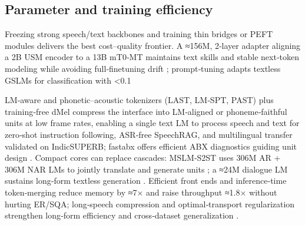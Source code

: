 \documentclass{article}
\begin{document}
\subsection{Parameter and training efficiency} \label{subsec:Parameter and training efficiency}
Freezing strong speech/text backbones and training thin bridges or PEFT modules delivers the best cost–quality frontier. A ≈156M, 2‑layer adapter aligning a 2B USM encoder to a 13B mT0‑MT maintains text skills and stable next‑token modeling while avoiding full‑finetuning drift \cite{wang2023slmbridgethingapbetweenspeechtextfoundat}; prompt‑tuning adapts textless GSLMs for classification with <0.1%

LM‑aware and phonetic–acoustic tokenizers (LAST, LM‑SPT, PAST) plus training‑free dMel compress the interface into LM‑aligned or phoneme‑faithful units at low frame rates, enabling a single text LM to process speech and text for zero‑shot instruction following, ASR‑free SpeechRAG, and multilingual transfer validated on IndicSUPERB; fastabx offers efficient ABX diagnostics guiding unit design \cite{turetzky2024lastlanguagemodelawarespeechtokenization,jo2025lmsptalignedsemanticdistillationspeechto,har-tuv2025pastphoneticacousticspeechtokenizer,bai2025dmelspeechtokenizationmadesimple,min2025speechretrievalaugmentedgenerationwithou,poli2025fastabxlibraryefficientcomputationabxdis,entry2025indicsuperbspeechprocessinguniversalperf,vashishth2024stabspeechtokenizerassessmentbenchmark}. Compact cores can replace cascades: MSLM‑S2ST uses 306M AR + 306M NAR LMs to jointly translate and generate units \cite{peng2024mslms2stmultitaskspeechlanguagemodeltext}; a ≈24M dialogue LM sustains long‑form textless generation \cite{nakata2024jchatjapaneselargescalespokendialoguecor}. Efficient front ends and inference‑time token‑merging reduce memory by ≈7× and raise throughput ≈1.8× without hurting ER/SQA; long‑speech compression and optimal‑transport regularization strengthen long‑form efficiency and cross‑dataset generalization \cite{lu2024fastadaspmultitaskadaptedefficientinfere,guo2025fastlongspeechenhancinglargespeechlangua,xu2025optimaltransportregularizationspeechtext}.
\end{document}
